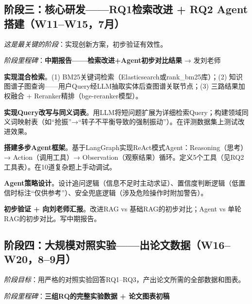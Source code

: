 \documentclass[a4paper, 11pt]{ctexart}
\begin{document}
\subsection{阶段三：核心研发——RQ1检索改进 + RQ2 Agent搭建（W11--W15，7月）}

\noindent\textit{这是最关键的阶段}：实现创新方案，初步验证有效性。

\noindent\textit{阶段里程碑}：{\color{tsinghua}\textbf{中期报告——检索改进+Agent初步对比结果} → 发刘老师}

\begin{description}[style=nextline, leftmargin=1.2cm, labelwidth=1cm, font=\bfseries\color{tsinghua}]
\item[W11] \textbf{实现混合检索}。(1) BM25关键词检索（Elasticsearch或rank\_bm25库）；(2) 知识图谱子图查询——用户Query经LLM抽取实体后查图谱关联节点；(3) 三路结果加权融合 + Reranker精排（bge-reranker模型）。
\item[W12] \textbf{实现Query改写与同义词表}。用LLM将短问题扩展为详细检索Query；构建领域同义词映射表（如``抢振''→``转子不平衡导致的强制振动''）。在评测数据集上测试改进效果。
\item[W13] \textbf{搭建多步Agent框架}。基于LangGraph实现ReAct模式Agent：Reasoning（思考）→ Action（调用工具）→ Observation（观察结果）循环。定义5个工具（见RQ2工具表）。在10道复杂题上手动调试。
\item[W14] \textbf{Agent策略设计}。设计追问逻辑（信息不足时主动求证）、置信度判断逻辑（低置信时标注``仅供参考''）、安全兜底逻辑（涉及危险操作时附加警告）。
\item[W15] \textbf{初步验证 + 向刘老师汇报}。改进RAG vs 基础RAG的初步对比；Agent vs 单轮RAG的初步对比。写中期报告。
\end{description}

\subsection{阶段四：大规模对照实验——出论文数据（W16--W20，8--9月）}

\noindent\textit{阶段目标}：用严格的对照实验回答RQ1--RQ3，产出论文所需的全部数据和图表。

\noindent\textit{阶段里程碑}：{\color{tsinghua}\textbf{三组RQ的完整实验数据 + 论文图表初稿}}
\end{document}
